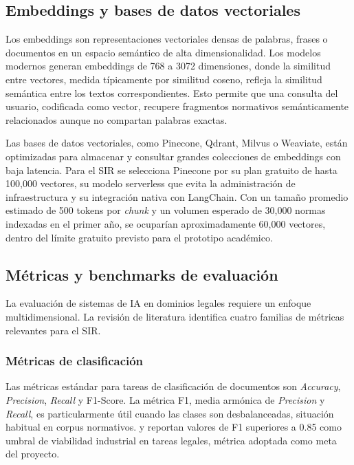 \documentclass[12pt,a4paper,oneside]{report}
\begin{document}
\subsection{Embeddings y bases de datos vectoriales}\label{subsec:embeddings-bases-vectoriales}

Los embeddings son representaciones vectoriales densas de palabras, frases o documentos en un espacio semántico de alta dimensionalidad. Los modelos modernos generan embeddings de 768 a 3072 dimensiones, donde la similitud entre vectores, medida típicamente por similitud coseno, refleja la similitud semántica entre los textos correspondientes. Esto permite que una consulta del usuario, codificada como vector, recupere fragmentos normativos semánticamente relacionados aunque no compartan palabras exactas.

Las bases de datos vectoriales, como Pinecone, Qdrant, Milvus o Weaviate, están optimizadas para almacenar y consultar grandes colecciones de embeddings con baja latencia. Para el SIR se selecciona Pinecone por su plan gratuito de hasta 100,000 vectores, su modelo serverless que evita la administración de infraestructura y su integración nativa con LangChain. Con un tamaño promedio estimado de 500 tokens por \textit{chunk} y un volumen esperado de 30,000 normas indexadas en el primer año, se ocuparían aproximadamente 60,000 vectores, dentro del límite gratuito previsto para el prototipo académico.

\subsection{Métricas y benchmarks de evaluación}\label{subsec:metricas-benchmarks-evaluacion}

La evaluación de sistemas de IA en dominios legales requiere un enfoque multidimensional. La revisión de literatura identifica cuatro familias de métricas relevantes para el SIR.

\subsubsection{Métricas de clasificación}\label{subsubsec:metricas-clasificacion}

Las métricas estándar para tareas de clasificación de documentos son \textit{Accuracy}, \textit{Precision}, \textit{Recall} y F1-Score. La métrica F1, media armónica de \textit{Precision} y \textit{Recall}, es particularmente útil cuando las clases son desbalanceadas, situación habitual en corpus normativos. \textcite{noronha2025} y \textcite{orosz2021} reportan valores de F1 superiores a 0.85 como umbral de viabilidad industrial en tareas legales, métrica adoptada como meta del proyecto.
\end{document}
